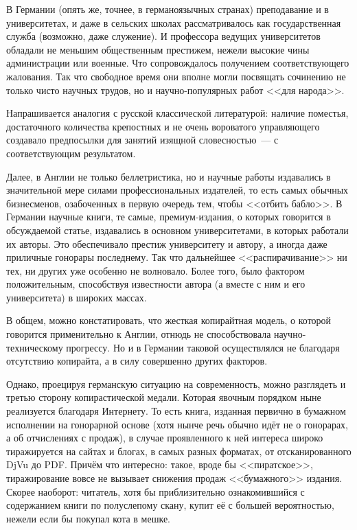 В Германии (опять же, точнее, в германоязычных странах) преподавание и в университетах, и даже в сельских школах рассматривалось как государственная служба (возможно, даже служение). И профессора ведущих университетов обладали не меньшим общественным престижем, нежели высокие чины администрации или военные. Что сопровождалось получением соответствующего жалования. Так что свободное время они вполне могли посвящать сочинению не только чисто научных трудов, но и научно-популярных работ <<для народа>>.

Напрашивается аналогия с русской классической литературой: наличие поместья, достаточного количества крепостных и не очень вороватого управляющего создавало предпосылки для занятий изящной словесностью~--- с соответствующим результатом.

Далее, в Англии не только беллетристика, но и научные работы издавались в значительной мере силами профессиональных издателей, то есть самых обычных бизнесменов, озабоченных в первую очередь тем, чтобы <<отбить бабло>>. В Германии научные книги, те самые, премиум-издания, о которых говорится в обсуждаемой статье, издавались в основном университетами, в которых работали их авторы. Это обеспечивало престиж университету и автору, а иногда даже приличные гонорары последнему. Так что дальнейшее <<распирачивание>> ни тех, ни других уже особенно не волновало. Более того, было фактором положительным, способствуя известности автора (а вместе с ним и его университета) в широких массах.

В общем, можно констатировать, что жесткая копирайтная модель, о которой говорится применительно к Англии, отнюдь не способствовала научно-техническому прогрессу. Но и в Германии таковой осуществлялся не благодаря отсутствию копирайта, а в силу совершенно других факторов.

Однако, проецируя германскую ситуацию на современность, можно разглядеть и третью сторону копирастической медали. Которая явочным порядком ныне реализуется благодаря Интернету. То есть книга, изданная первично в бумажном исполнении на гонорарной основе (хотя нынче речь обычно идёт не о гонорарах, а об отчислениях с продаж), в случае проявленного к ней интереса широко тиражируется на сайтах и блогах, в самых разных форматах, от отсканированного DjVu до PDF. Причём что интересно: такое, вроде бы <<пиратское>>, тиражирование вовсе не вызывает снижения продаж <<бумажного>> издания. Скорее наоборот: читатель, хотя бы приблизительно ознакомившийся с содержанием книги по полуслепому скану, купит её с большей вероятностью, нежели если бы покупал кота в мешке.

